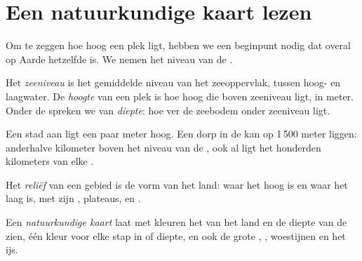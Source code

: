 \section{Een natuurkundige kaart lezen}

Om te zeggen hoe hoog een plek ligt, hebben we een beginpunt nodig dat
overal op Aarde hetzelfde is. We nemen het niveau van de .

\begin{definition}\label{def:g4:world-physical-map:altitude}
Het \emph{zeeniveau} is het gemiddelde niveau van het
zeeoppervlak, tussen hoog- en laagwater. De \emph{hoogte} van
een plek is hoe hoog die boven zeeniveau ligt, in meter. Onder de 
spreken we van \emph{diepte}: hoe ver de zeebodem onder zeeniveau ligt.
\end{definition}

Een stad aan  ligt een paar meter hoog. Een dorp in de  kan op
1\,500 meter liggen: anderhalve kilometer boven het niveau van de , ook
al ligt het honderden kilometers van elke .

\begin{definition}[Reliëf]\label{def:g4:world-physical-map:relief}
Het \emph{reliëf} van een gebied is de vorm van het
land: waar het hoog is en waar het laag is, met zijn , plateaus,
 en .
\end{definition}

\begin{definition}\label{def:g4:world-physical-map:physical-map}
Een \emph{natuurkundige kaart} laat met kleuren
het  van het land en de diepte van de  zien, één kleur voor elke
stap in  of diepte, en ook de grote , , woestijnen en
het ijs.
\end{definition}

